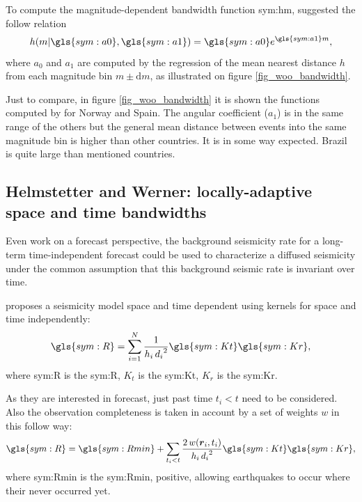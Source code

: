 \documentclass[grl]{agutex}
\begin{document}
\begin{article}
To compute the magnitude-dependent bandwidth function \gls{sym:hm}, \citet{woo_1996} suggested the follow relation
\begin{equation}
	\ensuremath{
		h(m\arrowvert \gls{sym:a0}, \gls{sym:a1}) = \gls{sym:a0}e^{\gls{sym:a1}m},
	}
	\label{eq:hm}
\end{equation}
where $a_0$ and $a_1$ are computed by the regression of the mean nearest distance $h$ from each magnitude bin $m \pm \mathrm{d}m$, as illustrated on figure \ref{fig_woo_bandwidth}.

Just to compare, in figure \ref{fig_woo_bandwidth} it is shown the functions computed by \citet{beauval_2003} for Norway and Spain. The angular coefficient ($a_1$) is in the same range of the others but the general mean distance between events into the same magnitude bin is higher than other countries. It is in some way expected. Brazil is quite large than mentioned countries.



\subsection{Helmstetter and Werner: locally-adaptive space and time bandwidths}


Even work on a forecast perspective, the background seismicity rate for a long-term time-independent forecast could be used to characterize a diffused seismicity under the common assumption that this background seismic rate is invariant over time.

\citet{helmstetter_2012} proposes a seismicity model space and time dependent using kernels for space and time independently:
\begin{equation}
	\ensuremath{\gls{sym:R} = \sum_{i=1}^{N}{ \frac{1}{h_i\,{d_i}^2} \gls{sym:Kt}\gls{sym:Kr} }},
	\label{eq:helms01}
\end{equation}
where \gls{sym:R} is the \glsdesc{sym:R},
	  $K_t$ is the \glsdesc{sym:Kt},
	  $K_r$ is the \glsdesc{sym:Kr}.


As they are interested in forecast, just past time $t_i < t$ need to be considered. Also the observation completeness is taken in account by a set of weights $w$ in this follow way:
\begin{equation}
\ensuremath{\gls{sym:R} = \gls{sym:Rmin} + \sum_{t_i < t}{
	\frac{2\,w(\boldsymbol{r}_i,t_i)}{h_i\,{d_i}^2}
			\gls{sym:Kt}\gls{sym:Kr} }},
	\label{eq:helms02}
\end{equation}
where \gls{sym:Rmin} is the \glsdesc{sym:Rmin}, positive, allowing earthquakes to occur where their never occurred yet.


\end{article}
\end{document}
